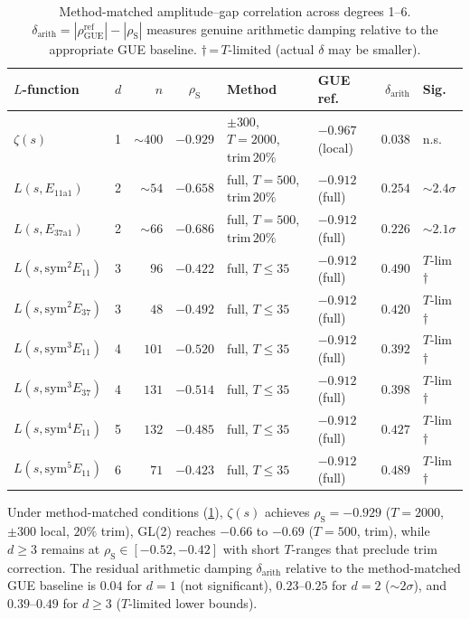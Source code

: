 \documentclass[11pt,a4paper]{article}
\theoremstyle{plain}
\theoremstyle{definition}
\DeclareMathOperator{\GUE}{GUE}
\begin{document}
\begin{table}[h]
\centering
\caption{Method-matched amplitude--gap correlation across degrees 1--6.
$\delta_{\mathrm{arith}} = |\rho_{\GUE}^{\text{ref}}| - |\rho_{\mathrm{S}}|$
measures genuine arithmetic damping relative to the appropriate
GUE baseline.  $\dagger$\,=\,$T$-limited (actual $\delta$ may be smaller).}
\label{tab:unified}
\small
\begin{tabular}{llrcllrl}
\toprule
\textbf{$L$-function} & $d$ & $n$ &
$\rho_{\mathrm{S}}$ & \textbf{Method} &
\textbf{GUE ref.} & $\delta_{\mathrm{arith}}$ & \textbf{Sig.} \\
\midrule
$\zeta(s)$ & 1 & ${\sim}400$ & $-0.929$ &
  $\pm 300$, $T\!=\!2000$, trim\,$20\%$ &
  $-0.967$ (local) & $0.038$ & n.s.\ \\
$L(s,E_{11\mathrm{a}1})$ & 2 & ${\sim}54$ & $-0.658$ &
  full, $T\!=\!500$, trim\,$20\%$ &
  $-0.912$ (full) & $0.254$ & ${\sim}2.4\sigma$ \\
$L(s,E_{37\mathrm{a}1})$ & 2 & ${\sim}66$ & $-0.686$ &
  full, $T\!=\!500$, trim\,$20\%$ &
  $-0.912$ (full) & $0.226$ & ${\sim}2.1\sigma$ \\
$L(s,\mathrm{sym}^2 E_{11})$ & 3 & $96$ & $-0.422$ &
  full, $T\!\le\!35$ &
  $-0.912$ (full) & $0.490$ & $T$-lim$\dagger$ \\
$L(s,\mathrm{sym}^2 E_{37})$ & 3 & $48$ & $-0.492$ &
  full, $T\!\le\!35$ &
  $-0.912$ (full) & $0.420$ & $T$-lim$\dagger$ \\
$L(s,\mathrm{sym}^3 E_{11})$ & 4 & $101$ & $-0.520$ &
  full, $T\!\le\!35$ &
  $-0.912$ (full) & $0.392$ & $T$-lim$\dagger$ \\
$L(s,\mathrm{sym}^3 E_{37})$ & 4 & $131$ & $-0.514$ &
  full, $T\!\le\!35$ &
  $-0.912$ (full) & $0.398$ & $T$-lim$\dagger$ \\
$L(s,\mathrm{sym}^4 E_{11})$ & 5 & $132$ & $-0.485$ &
  full, $T\!\le\!35$ &
  $-0.912$ (full) & $0.427$ & $T$-lim$\dagger$ \\
$L(s,\mathrm{sym}^5 E_{11})$ & 6 & $71$ & $-0.423$ &
  full, $T\!\le\!35$ &
  $-0.912$ (full) & $0.489$ & $T$-lim$\dagger$ \\
\bottomrule
\end{tabular}
\end{table}

Under method-matched conditions (\cref{tab:unified}),
$\zeta(s)$ achieves $\rho_{\mathrm{S}} = -0.929$
($T = 2000$, $\pm 300$ local, $20\%$ trim),
GL(2) reaches $-0.66$ to $-0.69$ ($T = 500$, trim),
while $d \ge 3$ remains at $\rho_{\mathrm{S}} \in [-0.52, -0.42]$
with short $T$-ranges that preclude trim correction.
The residual arithmetic damping $\delta_{\mathrm{arith}}$
relative to the method-matched GUE baseline is
$0.04$ for $d = 1$ (not significant),
$0.23$--$0.25$ for $d = 2$ (${\sim}2\sigma$), and
$0.39$--$0.49$ for $d \ge 3$ ($T$-limited lower bounds).
\end{document}

